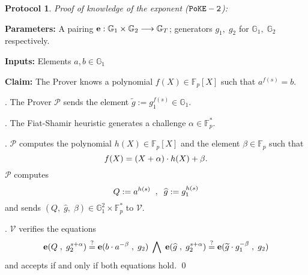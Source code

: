 \documentclass[11pt, lettersize, notitlepage, leqno, footskip=0.6cm]{article}
\newcommand{\bFp}{\mathbb{F}_p}
\newcommand{\bG}{\mathbb{G}}
\newcommand{\lra}{\longrightarrow}
\newcommand{\wti}{\widetilde}
\newcommand{\mc}{\mathcal}
\newcommand{\mb}{\mathbb}
\newcommand{\al}{\alpha}
\newcommand{\be}{\beta}
\newcommand{\what}{\widehat}
\newcommand{\mP}{\mc{P}}
\newcommand{\V}{\mc{V}}
\newcommand{\vs}{\vspace{-0.15cm}}
\newcommand{\noin}{\noindent}
\newcommand{\sta}{\stackrel{?}{=}}
\newtheorem{Prot}[Thm]{Protocol}
\numberwithin{equation}{section}
\begin{document}
\begin{mdframed}

\begin{Prot} \normalfont \hypertarget{PoKE}{\textit{Proof of knowledge of the exponent}} (${\tt{PoKE-2}}$):\end{Prot} 

\noin \textbf{Parameters:} A pairing ${\bf{e}}:\mb{G}_1\times \mb{G}_2\lra \mb{G}_T$; generators $g_1,\;g_2$ for $\mb{G}_1,\; \mb{G}_2$ respectively.


\noin \textbf{Inputs:} Elements $a, b\in \mb{G}_1$

\noin \textbf{Claim:} The Prover knows a polynomial $f(X)\in \bFp[X]$ such that $a^{f(s)} = b$.\vspace{1mm}

\noin {}. The Prover $\mP$ sends the element $\wti{g}:= g_1^{f(s)}\in \bG_1$.\vspace{1mm} 

\noin 2. The Fiat-Shamir heuristic generates a challenge $\al\in \bFp^*$. \vspace{1mm}

\noin 3. $\mP$ computes the polynomial $h(X)\in \bFp[X]$ and the element $\be\in \bFp$ such that \vs $$f(X) = (X+\al)\cdot h(X)+ \be. \vs $$ $\mP$ computes \vs $$Q:= a^{h(s)}\;\;,\;\;\what{g}:= g_1^{h(s)}\vs $$ and sends $(Q,\;\what{g},\;\be)\in \mb{G}_1^2\times \bFp^*$ to $\V$. \vspace{1mm}

\noin 4. $\V$ verifies the equations \vs $$\mathbf{e}(Q\;, \;g_2^{s+\al}) \sta \mathbf{e}(b\cdot a^{-\be}\;,\; g_2)\;\bigwedge\;\mathbf{e}(\what{g}\;,\; g_2^{s+\al}) \sta \mathbf{e}(\wti{g}\cdot g_1^{-\be}\;,\; g_2) \vs $$ and accepts if and only if both equations hold. \qed \end{mdframed}



\bigskip
\end{document}
